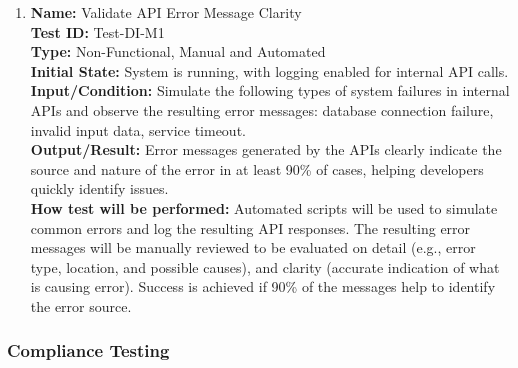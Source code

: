 \documentclass[12pt, titlepage]{article}
\begin{document}
\begin{enumerate}

  \item \textbf{Name:} Validate API Error Message Clarity \label{itm:Test-DI-M1} \\
        \textbf{Test ID:} Test-DI-M1 \\
        \textbf{Type:} Non-Functional, Manual and Automated \\
        \textbf{Initial State:} System is running, with logging enabled for internal API calls. \\
        \textbf{Input/Condition:} Simulate the following types of system failures in internal APIs and observe the resulting error messages: database connection failure, invalid input data, service timeout. \\
        \textbf{Output/Result:} Error messages generated by the APIs clearly indicate the source and nature of the error in at least 90\% of cases, helping developers quickly identify issues. \\
        \textbf{How test will be performed:} Automated scripts will be used to simulate common errors and log the resulting API responses. The resulting error messages will be manually reviewed to be evaluated on detail (e.g., error type, location, and possible causes), and clarity (accurate indication of what is causing error). Success is achieved if 90\% of the messages help to identify the error source.


\end{enumerate}
\subsubsection{Compliance Testing}
\end{document}

